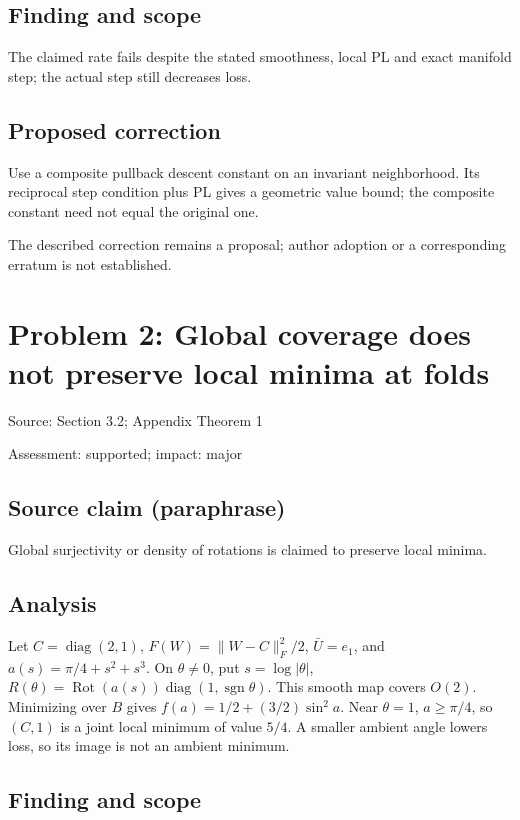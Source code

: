 \documentclass[11pt]{article}
\begin{document}
\subsection*{Finding and scope}

The claimed rate fails despite the stated smoothness, local PL and exact manifold step; the actual step still decreases loss.

\subsection*{Proposed correction}

Use a composite pullback descent constant on an invariant neighborhood. Its reciprocal step condition plus PL gives a geometric value bound; the composite constant need not equal the original one.

The described correction remains a proposal; author adoption or a corresponding erratum is not established.

\section*{Problem 2: Global coverage does not preserve local minima at folds}

Source: Section 3.2; Appendix Theorem 1

Assessment: supported; impact: major

\subsection*{Source claim (paraphrase)}

Global surjectivity or density of rotations is claimed to preserve local minima.

\subsection*{Analysis}

Let \(C=\operatorname{diag}(2,1)\), \(F(W)=\|W-C\|_F^2/2\), \(\bar U=e_1\), and \(a(s)=\pi/4+s^2+s^3\). On \(\theta\ne0\), put \(s=\log|\theta|\), \(R(\theta)=\operatorname{Rot}(a(s))\operatorname{diag}(1,\operatorname{sgn}\theta)\). This smooth map covers \(O(2)\). Minimizing over \(B\) gives \(f(a)=1/2+(3/2)\sin^2a\). Near \(\theta=1\), \(a\ge\pi/4\), so \((C,1)\) is a joint local minimum of value \(5/4\). A smaller ambient angle lowers loss, so its image is not an ambient minimum.

\subsection*{Finding and scope}
\end{document}
